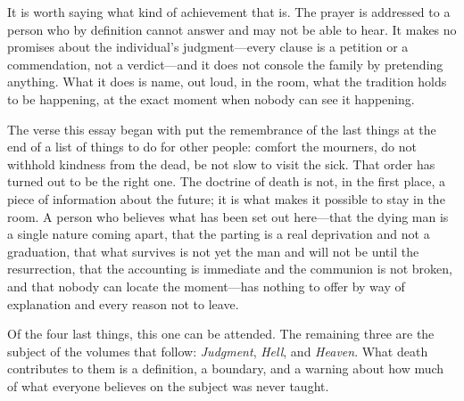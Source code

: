 It is worth saying what kind of achievement that is. The prayer is addressed to a person who by definition cannot answer and may not be able to hear. It makes no promises about the individual's judgment---every clause is a petition or a commendation, not a verdict---and it does not console the family by pretending anything. What it does is name, out loud, in the room, what the tradition holds to be happening, at the exact moment when nobody can see it happening.

The verse this essay began with put the remembrance of the last things at the end of a list of things to do for other people: comfort the mourners, do not withhold kindness from the dead, be not slow to visit the sick. That order has turned out to be the right one. The doctrine of death is not, in the first place, a piece of information about the future; it is what makes it possible to stay in the room. A person who believes what has been set out here---that the dying man is a single nature coming apart, that the parting is a real deprivation and not a graduation, that what survives is not yet the man and will not be until the resurrection, that the accounting is immediate and the communion is not broken, and that nobody can locate the moment---has nothing to offer by way of explanation and every reason not to leave.

Of the four last things, this one can be attended. The remaining three are the subject of the volumes that follow: \emph{Judgment}, \emph{Hell}, and \emph{Heaven}. What death contributes to them is a definition, a boundary, and a warning about how much of what everyone believes on the subject was never taught.
